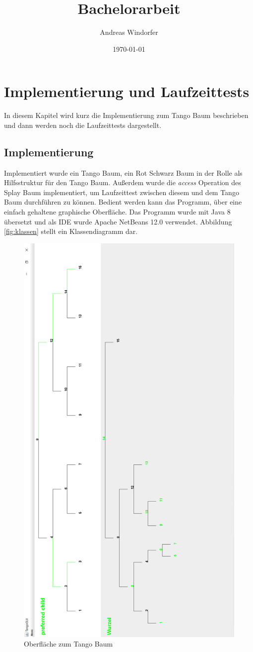 \documentclass[a4paper,12pt]{article}
\title{Bachelorarbeit}
\author{
	Andreas Windorfer\\
}
\date{\today}
\begin{document}
\tableofcontents
\section{Implementierung und Laufzeittests}
In diesem Kapitel wird kurz die Implementierung zum Tango Baum beschrieben und dann werden noch die Laufzeittests dargestellt. 
\subsection{Implementierung}
Implementiert wurde ein Tango Baum, ein Rot Schwarz Baum in der Rolle als Hilfsstruktur für den Tango Baum. Außerdem wurde die \textit{access} Operation des Splay Baum implementiert, um Laufzeittest zwischen diesem und dem Tango Baum durchführen zu können. Bedient werden kann das Programm, über eine einfach gehaltene graphische Oberfläche. Das Programm wurde mit Java 8 übersetzt und als IDE wurde Apache NetBeans 12.0 verwendet. Abbildung \ref{fig:klassen} stellt ein Klassendiagramm dar.
\begin{figure}[H]
	\centering
	\includegraphics[height= 1.7\textwidth]{"Medien/laufzeittest/MainGUI"}
	\caption{Oberfläche zum Tango Baum}
	\label{fig:TangoBaumGui}
\end{figure}
\end{document}
